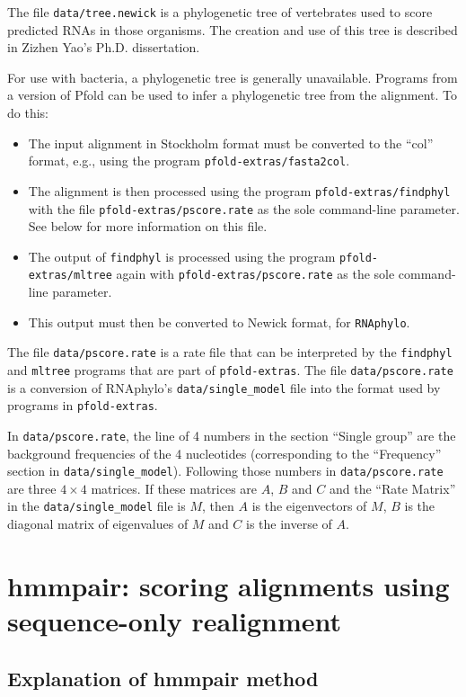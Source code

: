 \documentclass[letterpaper,12pt]{report}
\begin{document}
The file {\tt data/tree.newick} is a phylogenetic tree of vertebrates used to score predicted RNAs in those organisms.  The creation and use of this tree is described in Zizhen Yao's Ph.D. dissertation\cite{ZizhenThesis}.

For use with bacteria, a phylogenetic tree is generally unavailable.  Programs from a version of Pfold \cite{pfold} can be used to infer a phylogenetic tree from the alignment.  To do this:
\begin{itemize}
\item The input alignment in Stockholm format must be converted to the ``col'' format, e.g., using the program {\tt pfold-extras/fasta2col}.
\item The alignment is then processed using the program {\tt pfold-extras/findphyl} with the file {\tt pfold-extras/pscore.rate} as the sole command-line parameter.  See below for more information on this file.
\item The output of {\tt findphyl} is processed using the program {\tt pfold-extras/mltree} again with {\tt pfold-extras/pscore.rate} as the sole command-line parameter.
\item This output must then be converted to Newick format, for {\tt RNAphylo}.
\end{itemize}

The file {\tt data/pscore.rate} is a rate file that can be interpreted by the {\tt findphyl} and {\tt mltree} programs that are part of {\tt pfold-extras}.  The file {\tt data/pscore.rate} is a conversion of RNAphylo's {\tt data/single\_model} file into the format used by programs in {\tt pfold-extras}.

In {\tt data/pscore.rate}, the line of 4 numbers in the section ``Single group'' are the background frequencies of the 4 nucleotides (corresponding to the ``Frequency'' section in {\tt data/single\_model}).  Following those numbers in {\tt data/pscore.rate} are three $4\times 4$ matrices.  If these matrices are $A$, $B$ and $C$ and the ``Rate Matrix'' in the {\tt data/single\_model} file is $M$, then $A$ is the eigenvectors of $M$, $B$ is the diagonal matrix of eigenvalues of $M$ and $C$ is the inverse of $A$.

\chapter{hmmpair: scoring alignments using sequence-only realignment}

\section{Explanation of hmmpair method}
\end{document}
